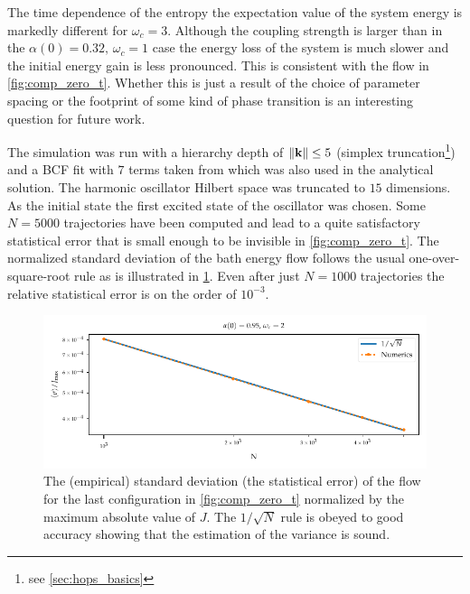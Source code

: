The time dependence of the entropy the expectation value of the system
energy is markedly different for \(ω_c=3\). Although the coupling
strength is larger than in the \(α(0)=0.32,\, ω_c=1\) case the energy
loss of the system is much slower and the initial energy gain is less
pronounced. This is consistent with the flow in
\cref{fig:comp_zero_t}. Whether this is just a result of the choice of
parameter spacing or the footprint of some kind of phase transition is
an interesting question for future work.

The simulation was run with a hierarchy depth of \(\norm{\vb{k}} \leq 5\)
(simplex truncation\footnote{see \cref{sec:hops_basics}}) and a BCF
fit with \(7\) terms taken from \cite{RichardDiss} which was also used
in the analytical solution. The harmonic oscillator Hilbert space was
truncated to \(15\) dimensions. As the initial state the first excited
state of the oscillator was chosen. Some \(N=5000\) trajectories have
been computed and lead to a quite satisfactory statistical error that
is small enough to be invisible in \cref{fig:comp_zero_t}. The
normalized standard deviation of the bath energy flow follows the
usual one-over-square-root rule as is illustrated in
\cref{fig:sqrt_conv}. Even after just \(N=1000\) trajectories the
relative statistical error is on the order of \(10^{-3}\).
\begin{figure}[htp]
  \centering
  \includegraphics{figs/analytic_comp/sqrt_convergence.pdf}
  \caption{\label{fig:sqrt_conv} The (empirical) standard deviation
    (the statistical error) of the flow for the last configuration in
    \cref{fig:comp_zero_t} normalized by the maximum absolute value of
    \(J\). The \(1/\sqrt{N}\) rule is obeyed to good accuracy showing
    that the estimation of the variance is sound.}
\end{figure}
